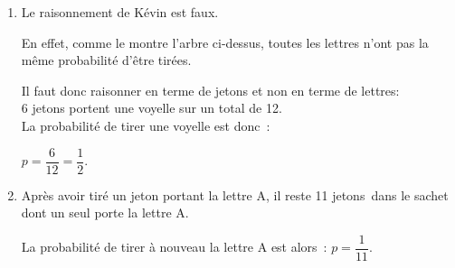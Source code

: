 \begin{corrige}
\begin{enumerate}
\begin{center}
\begin{extern}
               \end{extern}
          \end{center}
          \item %
          Le raisonnement de Kévin est faux.
          \par
          En effet, comme le montre l'arbre ci-dessus, toutes les lettres n'ont pas la même probabilité d'être tirées.
          \par
          Il faut donc raisonner en terme de jetons et non en terme de lettres:\\
          6 jetons portent une voyelle sur un total de 12. \\
          La probabilité de tirer une voyelle est donc~:
          \par
          $p=\dfrac{6}{12}=\dfrac{1}{2}.$
          \item %
          Après avoir tiré un jeton portant la lettre A, il reste 11 jetons~dans le sachet dont un seul porte la lettre A.
          \par
          La probabilité de tirer à nouveau la lettre A est alors~:
          $p=\dfrac{1}{11}.$
     \end{enumerate}
\end{corrige}
